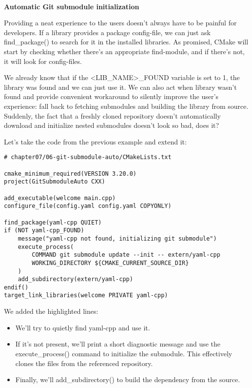 \hspace*{\fill} \\ %
\noindent
\textbf{Automatic Git submodule initialization}

Providing a neat experience to the users doesn't always have to be painful for developers. If a library provides a package config-file, we can just ask find\_package() to search for it in the installed libraries. As promised, CMake will start by checking whether there's an appropriate find-module, and if there's not, it will look for config-files.

We already know that if the <LIB\_NAME>\_FOUND variable is set to 1, the library was found and we can just use it. We can also act when library wasn't found and provide convenient workaround to silently improve the user's experience: fall back to fetching submodules and building the library from source. Suddenly, the fact that a freshly cloned repository doesn't automatically download and initialize nested submodules doesn't look so bad, does it?

Let's take the code from the previous example and extend it:

\begin{lstlisting}[style=styleCMake]
# chapter07/06-git-submodule-auto/CMakeLists.txt

cmake_minimum_required(VERSION 3.20.0)
project(GitSubmoduleAuto CXX)

add_executable(welcome main.cpp)
configure_file(config.yaml config.yaml COPYONLY)

find_package(yaml-cpp QUIET)
if (NOT yaml-cpp_FOUND)
	message("yaml-cpp not found, initializing git submodule")
	execute_process(
		COMMAND git submodule update --init -- extern/yaml-cpp
		WORKING_DIRECTORY ${CMAKE_CURRENT_SOURCE_DIR}
	)
	add_subdirectory(extern/yaml-cpp)
endif()
target_link_libraries(welcome PRIVATE yaml-cpp)
\end{lstlisting}

We added the highlighted lines:

\begin{itemize}
\item 
We'll try to quietly find yaml-cpp and use it.

\item 
If it's not present, we'll print a short diagnostic message and use the execute\_process() command to initialize the submodule. This effectively clones the files from the referenced repository.

\item 
Finally, we'll add\_subdirectory() to build the dependency from the source.
\end{itemize}

